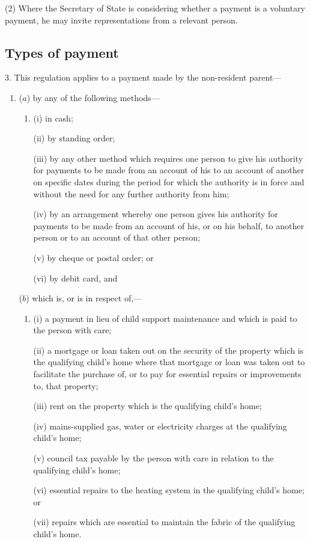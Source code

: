 \documentclass[12pt,a4paper]{article}
\begin{document}
(2) Where the Secretary of State is considering whether a payment is a voluntary payment, he may invite representations from a relevant person.

\subsection[3. Types of payment]{Types of payment}

3.  This regulation applies to a payment made by the non-resident parent—
\begin{enumerate}\item[]
($a$) by any of the following methods—
\begin{enumerate}\item[]
(i) in cash;

(ii) by standing order;

(iii) by any other method which requires one person to give his authority for payments to be made from an account of his to an account of another on specific dates during the period for which the authority is in force and without the need for any further authority from him;

(iv) by an arrangement whereby one person gives his authority for payments to be made from an account of his, or on his behalf, to another person or to an account of that other person;

(v) by cheque or postal order; or

(vi) by debit card, and
\end{enumerate}

($b$) which is, or is in respect of,—
\begin{enumerate}\item[]
(i) a payment in lieu of child support maintenance and which is paid to the person with care;

(ii) a mortgage or loan taken out on the security of the property which is the qualifying child’s home where that mortgage or loan was taken out to facilitate the purchase of, or to pay for essential repairs or improvements to, that property;

(iii) rent on the property which is the qualifying child’s home;

(iv) mains-supplied gas, water or electricity charges at the qualifying child’s home;

(v) council tax payable by the person with care in relation to the qualifying child’s home;

(vi) essential repairs to the heating system in the qualifying child’s home; or

(vii) repairs which are essential to maintain the fabric of the qualifying child’s home.
\end{enumerate}
\end{enumerate}
\end{document}
